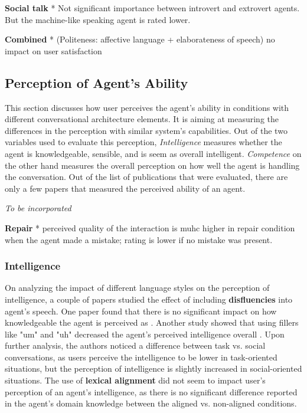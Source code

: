 \textbf{Social talk}
* Not significant importance between introvert and extrovert agents. But the machine-like speaking agent is rated lower. \cite{roy2021users}\cmt{[71]}

\textbf{Combined}
* (Politeness: affective language + elaborateness of speech) no impact on user satisfaction \cite{hu2022polite}\cmt{[76]}

\subsection{Perception of Agent's Ability}

This section discusses how user perceives the agent's ability in conditions with different conversational architecture elements. It is aiming at measuring the differences in the perception with similar system's capabilities. Out of the two variables used to evaluate this perception, \textit{Intelligence} measures whether the agent is knowledgeable, sensible, and is seem as overall intelligent. \textit{Competence} on the other hand measures the overall perception on how well the agent is handling the conversation. Out of the list of publications that were evaluated, there are only a few papers that measured the perceived ability of an agent.

\textit{To be incorporated}

\textbf{Repair}
* perceived quality of the interaction is muhc higher in repair condition when the agent made a mistake; rating is lower if no mistake was present. \cite{cuadra2021my}\cmt{[67]}

\subsubsection{Intelligence}

On analyzing the impact of different language styles on the perception of intelligence, a couple of papers studied the effect of including \textbf{disfluencies} into agent's speech. One paper found that there is no significant impact on how knowledgeable the agent is perceived as \cite{pfeifer2009should}\cmt{[12]}. Another study showed that using fillers like "um" and "uh" decreased the agent's perceived intelligence overall \cite{jeong2019exploring}\cmt{[10]}. Upon further analysis, the authors noticed a difference between task vs. social conversations, as users perceive the intelligence to be lower in task-oriented situations, but the perception of intelligence is slightly increased in social-oriented situations. The use of \textbf{lexical alignment} did not seem to impact user's perception of an agent's intelligence, as there is no significant difference reported in the agent's domain knowledge between the aligned vs. non-aligned conditions.


